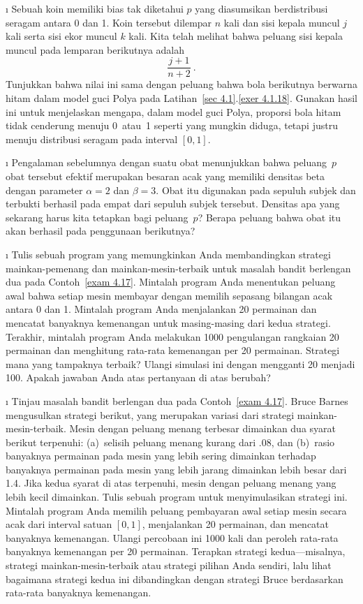 \begin{LJSItem}
\i\label{exer 4.2.10} Sebuah koin memiliki bias tak diketahui $p$ yang diasumsikan
berdistribusi seragam antara 0 dan 1.  Koin tersebut dilempar $n$ kali dan sisi kepala muncul
$j$ kali serta sisi ekor muncul $k$ kali.  Kita telah melihat bahwa peluang
sisi kepala muncul pada lemparan berikutnya adalah
$$
\frac {j + 1}{n + 2}\ .
$$
Tunjukkan bahwa nilai ini sama dengan peluang bahwa bola berikutnya berwarna hitam dalam
model guci Polya pada Latihan~\ref{sec 4.1}.\ref{exer 4.1.18}. 
Gunakan hasil ini untuk menjelaskan mengapa, dalam model guci Polya, proporsi bola hitam
tidak cenderung menuju 0~atau~1 seperti yang mungkin diduga, tetapi justru menuju
distribusi seragam pada interval $[0,1]$.

\i\label{exer 4.2.11} Pengalaman sebelumnya dengan suatu obat menunjukkan bahwa peluang~$p$
obat tersebut efektif merupakan besaran acak yang memiliki densitas beta dengan
parameter $\alpha = 2$ dan $\beta = 3$.  Obat itu digunakan pada sepuluh subjek dan
terbukti berhasil pada empat dari sepuluh subjek tersebut.  Densitas apa yang sekarang
harus kita tetapkan bagi peluang~$p$?  Berapa peluang bahwa obat itu
akan berhasil pada penggunaan berikutnya?

\i\label{exer 4.2.12} Tulis sebuah program yang memungkinkan Anda membandingkan strategi mainkan-pemenang
dan mainkan-mesin-terbaik untuk masalah bandit berlengan dua pada Contoh~\ref{exam
4.17}.  Mintalah program Anda menentukan peluang awal bahwa setiap mesin membayar
dengan memilih sepasang bilangan acak antara 0 dan 1.  Mintalah
program Anda menjalankan 20 permainan dan mencatat banyaknya kemenangan untuk masing-masing dari
kedua strategi.  Terakhir, mintalah program Anda melakukan 1000 pengulangan rangkaian 20
permainan dan menghitung rata-rata kemenangan per 20 permainan.  Strategi mana yang tampaknya
terbaik?  Ulangi simulasi ini dengan mengganti 20 menjadi 100.  Apakah jawaban Anda atas
pertanyaan di atas berubah?

\i\label{exer 4.2.13} Tinjau masalah bandit berlengan dua pada Contoh~\ref{exam 4.17}. 
Bruce Barnes mengusulkan strategi berikut, yang merupakan variasi dari
strategi mainkan-mesin-terbaik.  Mesin dengan peluang
menang terbesar dimainkan  dua syarat berikut terpenuhi: (a)~selisih
peluang menang kurang dari .08, dan (b)~rasio
banyaknya permainan pada mesin yang lebih sering dimainkan terhadap banyaknya
permainan pada mesin yang lebih jarang dimainkan lebih besar dari 1.4.  Jika
kedua syarat di atas terpenuhi, mesin dengan peluang
menang yang lebih kecil dimainkan.  Tulis sebuah program untuk menyimulasikan strategi ini.  Mintalah
program Anda memilih peluang pembayaran awal setiap mesin secara acak dari
interval satuan $[0,1]$, menjalankan 20 permainan, dan mencatat banyaknya kemenangan. 
Ulangi percobaan ini 1000 kali dan peroleh rata-rata banyaknya kemenangan per 20
permainan.  Terapkan strategi kedua---misalnya, strategi mainkan-mesin-terbaik atau strategi
pilihan Anda sendiri, lalu lihat bagaimana strategi kedua ini dibandingkan dengan strategi Bruce berdasarkan
rata-rata banyaknya kemenangan.

\end{LJSItem}

